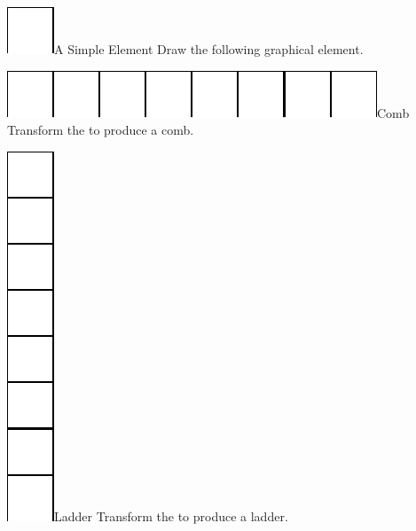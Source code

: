 \begin{exofigwithsizeandtitle}{\includegraphics{loopSimpleElement}}{A Simple Element}\label{exo:element}
Draw the following graphical element.
\end{exofigwithsizeandtitle}




\begin{exofigwithsizeandtitle}[0.3]{\includegraphics{loopComb}}{Comb}\label{exo:comb}
Transform the  to produce a comb.
\end{exofigwithsizeandtitle}



\begin{exofigwithsizeandtitle}{\includegraphics{loopLadder}}{Ladder}\label{exo:ladder}
Transform the  to produce a ladder.
\end{exofigwithsizeandtitle}


